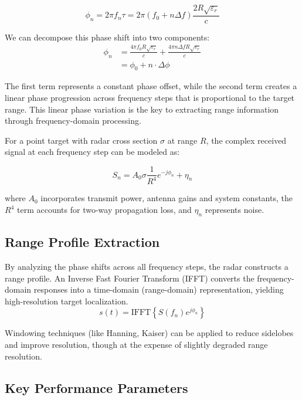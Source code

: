 \documentclass[11pt,a4paper]{article}
\begin{document}
\begin{equation}
    \phi_n = 2\pi f_n \tau = 2\pi \left( f_0 + n\Delta f \right) \frac{2R\sqrt{\varepsilon_r}}{c}
\end{equation}

We can decompose this phase shift into two components:
\begin{align}
    \phi_n &= \frac{4\pi f_0 R\sqrt{\varepsilon_r}}{c} + \frac{4\pi n\Delta f R\sqrt{\varepsilon_r}}{c}\\
    &= \phi_0 + n \cdot \Delta\phi
\end{align}

The first term represents a constant phase offset, while the second term creates a linear phase progression across frequency steps that is proportional to the target range. This linear phase variation is the key to extracting range information through frequency-domain processing.

For a point target with radar cross section $\sigma$ at range $R$, the complex received signal at each frequency step can be modeled as:

\begin{equation}
    S_n = A_0 \sigma \frac{1}{R^4} e^{-j\phi_n} + \eta_n
\end{equation}

where $A_0$ incorporates transmit power, antenna gains and system constants, the $R^4$ term accounts for two-way propagation loss, and $\eta_n$ represents noise.

\subsection{Range Profile Extraction}

By analyzing the phase shifts across all frequency steps, the radar constructs a range profile. An Inverse Fast Fourier Transform (IFFT) converts the frequency-domain responses into a time-domain (range-domain) representation, yielding high-resolution target localization.
\begin{equation}
    s(t) = \text{IFFT}\left\{ S(f_n) e^{j\phi_n} \right\}
\end{equation}

Windowing techniques (like Hanning, Kaiser) can be applied to reduce sidelobes and improve resolution, though at the expense of slightly degraded range resolution.

\subsection{Key Performance Parameters}
\end{document}
